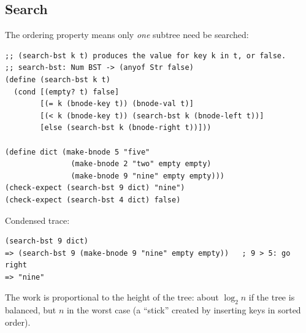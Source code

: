 \subsection{Search}
The ordering property means only \emph{one} subtree need be searched:
\begin{lstlisting}[style=racket]
;; (search-bst k t) produces the value for key k in t, or false.
;; search-bst: Num BST -> (anyof Str false)
(define (search-bst k t)
  (cond [(empty? t) false]
        [(= k (bnode-key t)) (bnode-val t)]
        [(< k (bnode-key t)) (search-bst k (bnode-left t))]
        [else (search-bst k (bnode-right t))]))

(define dict (make-bnode 5 "five"
               (make-bnode 2 "two" empty empty)
               (make-bnode 9 "nine" empty empty)))
(check-expect (search-bst 9 dict) "nine")
(check-expect (search-bst 4 dict) false)
\end{lstlisting}
Condensed trace:
\begin{lstlisting}[style=racket]
(search-bst 9 dict)
=> (search-bst 9 (make-bnode 9 "nine" empty empty))   ; 9 > 5: go right
=> "nine"
\end{lstlisting}
The work is proportional to the height of the tree: about $\log_2 n$ if the
tree is balanced, but $n$ in the worst case (a ``stick'' created by inserting
keys in sorted order).

\begin{center}
\end{center}

